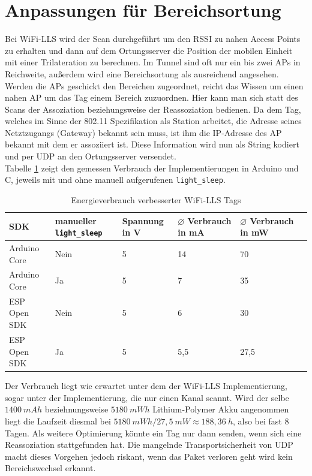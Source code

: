 \section{Anpassungen für Bereichsortung}
Bei WiFi-LLS wird der Scan durchgeführt um den RSSI zu nahen Access Points zu erhalten und dann auf dem Ortungsserver die Position der mobilen Einheit mit einer Trilateration zu berechnen.
Im Tunnel sind oft nur ein bis zwei APs in Reichweite, außerdem wird eine Bereichsortung als ausreichend angesehen. \\
Werden die APs geschickt den Bereichen zugeordnet, reicht das Wissen um einen nahen AP um das Tag einem Bereich zuzuordnen.
Hier kann man sich statt des Scans der Assoziation beziehungsweise der Reassoziation bedienen.
Da dem Tag, welches im Sinne der 802.11 Spezifikation als Station arbeitet, die Adresse seines Netztzugangs (Gateway) bekannt sein muss, ist ihm die IP-Adresse des AP bekannt mit dem er assoziiert ist.
Diese Information wird nun als String kodiert und per UDP an den Ortungsserver versendet.\\
Tabelle \ref{table:naiveconsumption} zeigt den gemessen Verbrauch der Implementierungen in Arduino und C, jeweils mit und ohne manuell aufgerufenen \texttt{light\_sleep}.

\begin{table}[h]
	\centering
	\caption{Energieverbrauch verbesserter WiFi-LLS Tags}
	\label{table:naiveconsumption}
	\begin{tabular}{p{3cm}|p{2.2cm}|p{1.5cm}|p{2cm}|p{2cm}|p{2cm}}
		SDK & manueller \texttt{light\_sleep} & Spannung in V & $\varnothing$ Verbrauch in mA & $\varnothing$ Verbrauch in mW \\
		\hline
		Arduino Core & Nein & 5 & 14 & 70 \\
		Arduino Core & Ja & 5 & 7 & 35 \\
		ESP Open SDK & Nein & 5 & 6 & 30 \\
		ESP Open SDK & Ja & 5 & 5,5 & 27,5 \\
	\end{tabular}
\end{table}

Der Verbrauch liegt wie erwartet unter dem der WiFi-LLS Implementierung, sogar unter der Implementierung, die nur einen Kanal scannt.
Wird der selbe $1400\ mAh$ beziehnungsweise $5180\ mWh$ Lithium-Polymer Akku angenommen liegt die Laufzeit diesmal  bei $5180\ mWh/27,5\ mW \approx 188,36\ h$, also bei fast 8 Tagen.
Als weitere Optimierung könnte ein Tag nur dann senden, wenn sich eine Reassoziation stattgefunden hat.
Die mangelnde Transportsicherheit von UDP macht dieses Vorgehen jedoch riskant, wenn das Paket verloren geht wird kein Bereichswechsel erkannt.


